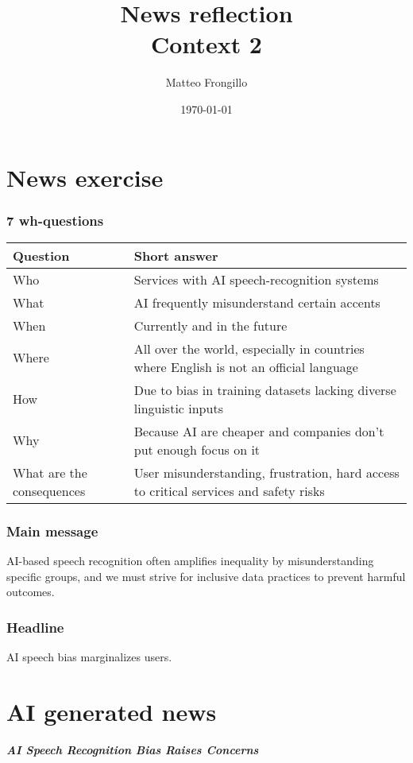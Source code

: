 \documentclass{article}
\title{\textbf{News reflection}\\\textbf{Context 2}}
\author{Matteo Frongillo}
\date{\today}
\begin{document}
\maketitle
\section*{News exercise}
\subsubsection*{7 wh-questions}
\begin{center}
    \setlength{\extrarowheight}{0.35cm}
    \begin{tabular}{|l|l|}
        \hline
        \textbf{Question} & \textbf{Short answer} \\ \hline
        Who & Services with AI speech-recognition systems \\ \hline
        What & AI frequently misunderstand certain accents \\ \hline
        When & Currently and in the future \\ \hline
        Where & All over the world, especially in countries where English is not an official language \\ \hline
        How & Due to bias in training datasets lacking diverse linguistic inputs \\ \hline
        Why & Because AI are cheaper and companies don't put enough focus on it \\ \hline
        What are the consequences & User misunderstanding, frustration, hard access to critical services and safety risks \\ \hline
    \end{tabular}
\end{center}


\subsubsection*{Main message}
AI-based speech recognition often amplifies inequality by misunderstanding specific
groups, and we must strive for inclusive data practices to prevent harmful outcomes.

\subsubsection*{Headline}
AI speech bias marginalizes users.

\section*{AI generated news}
\textit{\textbf{AI Speech Recognition Bias Raises Concerns}}
\end{document}
